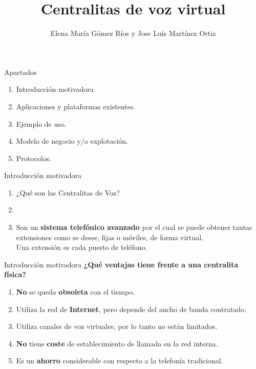 \documentclass[11pt]{beamer}
\author{Elena María Gómez Ríos y Jose Luis Martínez Ortiz}
\title{Centralitas de voz virtual} %
\begin{document}
\begin{frame}
\titlepage
\end{frame}


\begin{frame}{Apartados}
\begin{enumerate}
\item Introducción motivadora
\item Aplicaciones y plataformas existentes.
\item Ejemplo de uso.
\item Modelo de negocio y/o explotación.
\item Protocolos.
\end{enumerate}
\end{frame}


\begin{frame}{Introducción motivadora}
\begin{enumerate}[]
\item \begin{center}
¿Qué son las Centralitas de Voz?
\end{center}
\item 
\item \begin{center}
Son un \textbf{sistema telefónico avanzado} por el cual se puede obtener tantas extensiones como se desee, fijas o móviles, de forma virtual. 
\\Una extensión es cada puesto de teléfono.
\end{center}


\end{enumerate}
\end{frame}


\begin{frame}{Introducción motivadora}
\textbf{¿Qué ventajas tiene frente a una centralita física?}\\
\vspace{1cm}

\begin{enumerate}[$\bullet$]
\item \textbf{No} se queda \textbf{obsoleta} con el tiempo.
\item Utiliza la red de \textbf{Internet}, pero depende del ancho de banda contratado.
\item Utiliza canales de voz virtuales, por lo tanto no están limitados. 
\item \textbf{No} tiene \textbf{coste} de establecimiento de llamada en la red interna.
\item Es un \textbf{ahorro} considerable con respecto a la telefonía tradicional.
\end{enumerate}
\end{frame} 
\end{document}
